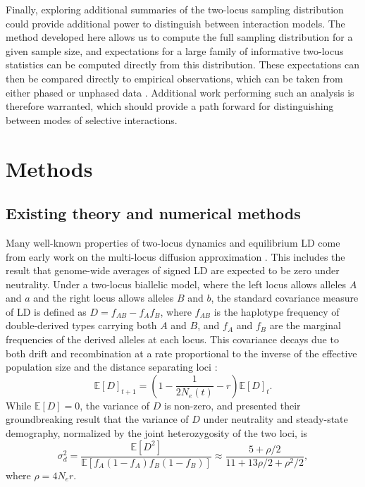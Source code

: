 \documentclass[]{article}
\newcommand{\E}{\mathbb{E}}
\begin{document}
Finally, exploring additional summaries of the two-locus sampling distribution
could provide additional power to distinguish between interaction models. The
method developed here allows us to compute the full sampling distribution for a
given sample size, and expectations for a large family of informative two-locus
statistics can be computed directly from this distribution. These expectations
can then be compared directly to empirical observations, which can be taken
from either phased or unphased data \citep{Ragsdale2020-nz}. Additional work
performing such an analysis is therefore warranted, which should provide a path
forward for distinguishing between modes of selective interactions.

\section{Methods}\label{sec:methods}

\subsection{Existing theory and numerical methods}
\label{existing-theory-and-numerical-methods}

Many well-known properties of two-locus dynamics and equilibrium LD come from
early work on the multi-locus diffusion approximation \citep{Kimura1955-qe, Hill1968-vu, Ohta1969-ie, Ohta1971-yd}.
This includes the result that
genome-wide averages of signed LD are expected to be zero under neutrality.
Under a two-locus biallelic model, where the left locus allows alleles \(A\) and
\(a\) and the right locus allows alleles \(B\) and \(b\), the standard covariance
measure of LD is defined as \(D = f_{AB} - f_{A}f_{B}\), where \(f_{AB}\) is the
haplotype frequency of double-derived types carrying both \(A\) and \(B\), and
\(f_{A}\) and \(f_{B}\) are the marginal frequencies of the derived alleles at each
locus. This covariance decays due to both drift and recombination at a rate
proportional to the inverse of the effective population size and the distance
separating loci \citep{Hill1968-vu}: \[\E[D]_{t+1} = \left(1 - \frac{1}{2N_e(t)} - r
\right)\E[D]_t.\] While \(\E[D] = 0\), the variance of \(D\) is non-zero, and
\citet{Ohta1971-yd} presented their groundbreaking result that the variance of \(D\)
under neutrality and steady-state demography, normalized by the joint
heterozygosity of the two loci, is \begin{equation} \label{eq:ohta} \sigma_d^2 =
\frac{\E[D^2]}{\E[f_A(1-f_A)f_B(1-f_B)]}\approx\frac{5 + \rho / 2}{11 + 13\rho
/ 2 + \rho^2 / 2}, \end{equation} where \(\rho = 4N_e r\).
\end{document}
